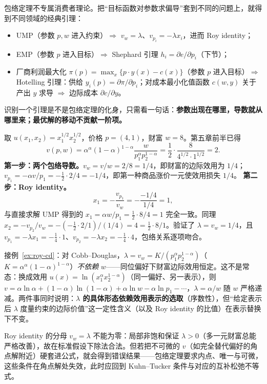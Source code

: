 \begin{remark}
包络定理不专属消费者理论。把“目标函数对参数求偏导”套到不同的问题上，就得到不同领域的经典引理：
\begin{itemize}
\item UMP（参数 $p,w$ 进入约束）$\Rightarrow$ $v_w=\lambda$、$v_{p_i}=-\lambda x_i$，进而 Roy identity；
\item EMP（参数 $p$ 进入目标）$\Rightarrow$ Shephard 引理 $h_i=\partial e/\partial p_i$（下节）；
\item 厂商利润最大化 $\pi(p)=\max_x\{p\cdot y(x)-c(x)\}$（参数 $p$ 进入目标）$\Rightarrow$ Hotelling 引理：供给 $y_i(p)=\partial\pi/\partial p_i$；对成本最小化值函数 $c(w,y)$ 关于产出 $y$ 求导 $\Rightarrow$ 边际成本 $\partial c/\partial y$。
\end{itemize}
识别一个引理是不是包络定理的化身，只需看一句话：\textbf{参数出现在哪里，导数就从哪里来；最优解的移动不贡献一阶项。}
\end{remark}

\begin{example}\label{ex:roy-cd}
取 $u(x_1,x_2)=x_1^{1/2}x_2^{1/2}$，价格 $p=(4,1)$，财富 $w=8$。第五章前半已得
\[
 v(p,w)=\alpha^{\alpha}(1-\alpha)^{1-\alpha}\frac{w}{p_1^{\alpha}p_2^{1-\alpha}}
 =\frac{1}{2}\cdot\frac{8}{4^{1/2}\cdot 1^{1/2}}=2 .
\]
\textbf{第一步：两个包络导数。}$v_w=v/w=2/8=1/4$，即财富的边际效用为 $1/4$；$v_{p_1}=-\alpha v/p_1=-\tfrac12\cdot 2/4=-1/4$，即第一种商品涨价一元使效用损失 $1/4$。
\textbf{第二步：Roy identity。}
\[
 x_1=-\frac{v_{p_1}}{v_w}=-\frac{-1/4}{1/4}=1,
\]
与直接求解 UMP 得到的 $x_1=\alpha w/p_1=\tfrac12\cdot 8/4=1$ 完全一致。同理 $x_2=-v_{p_2}/v_w=-( -\tfrac12\cdot 2/1)/(1/4)=4=\tfrac12\cdot 8/1$。验证了 $\lambda=v_w=1/4$，且 $v_{p_1}=-\lambda x_1=-\tfrac14\cdot 1$、$v_{p_2}=-\lambda x_2=-\tfrac14\cdot 4$，包络关系逐项吻合。
\end{example}

\begin{remark}[财富边际效用的递减形态]
接例~\ref{ex:roy-cd}：对 Cobb--Douglas，$\lambda=v_w=K/(p_1^{\alpha}p_2^{1-\alpha})$（$K=\alpha^{\alpha}(1-\alpha)^{1-\alpha}$）\emph{不依赖} $w$——同位偏好下财富边际效用恒定。这不是常态：换成效用 $u(x)=\ln(x_1^{\alpha}x_2^{1-\alpha})$（同一偏好、另一表示），则 $v=\alpha\ln\alpha+(1-\alpha)\ln(1-\alpha)+\alpha\ln w-\alpha\ln p_1-\cdots$，$\lambda=\alpha/w$ 随 $w$ 严格递减。两件事同时说明：\textbf{$\lambda$ 的具体形态依赖效用表示的选取}（序数性），但“给定表示后 $\lambda$ 度量约束的边际价值”这一定性含义（以及 Roy identity 的比值）在表示替换下不变。
\end{remark}

\begin{remark}[一个常见的误用]
Roy identity 的分母 $v_w=\lambda$ 不能为零：局部非饱和保证 $\lambda>0$（多一元财富总能严格改善），故在标准假设下除法合法。但若把不可微的 $v$（如完全替代偏好的角点解附近）硬套进公式，就会得到错误结果——包络定理要求内点、唯一与可微，这些条件在角点解处失效，此时应回到 Kuhn--Tucker 条件与对应的互补松弛不等式。
\end{remark}
